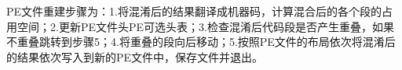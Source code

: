 

PE文件重建步骤为：1.将混淆后的结果翻译成机器码，计算混合后的各个段的占用空间；2.更新PE文件头PE可选头表；3.检查混淆后代码段是否产生重叠，如果不重叠跳转到步骤5；4.将重叠的段向后移动；5.按照PE文件的布局依次将混淆后的结果依次写入到新的PE文件中，保存文件并退出。








\label{cha2:sec:arch}



